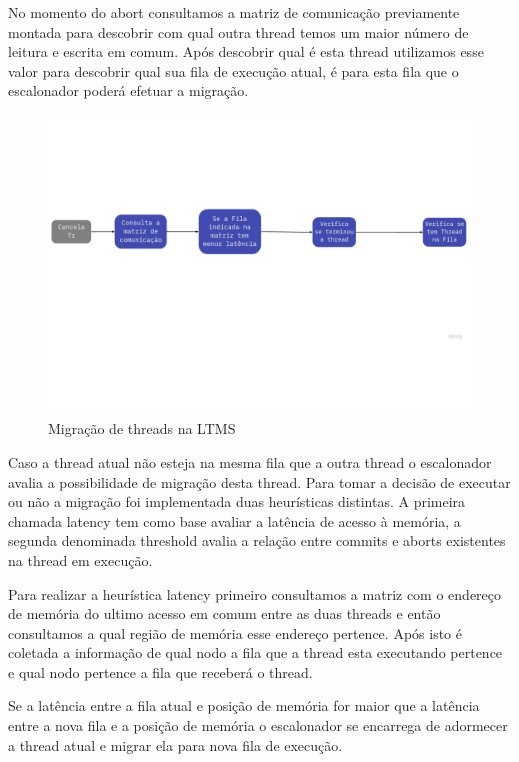 \documentclass[diss,capa]{texufpel}
\begin{document}
No momento do abort consultamos a matriz de comunicação previamente montada para descobrir com qual outra thread temos um maior número de leitura e escrita em comum. Após descobrir qual é esta thread utilizamos esse valor para descobrir qual sua fila de execução atual, é para esta fila que o escalonador poderá efetuar a migração.

\begin{figure}[htbp]
  \centering \includegraphics[scale=.5]{images/lstm2}
\caption{Migração de threads na LTMS} 
\label{LTMS2}
\end{figure}

Caso a thread atual não esteja na mesma fila que a outra thread o escalonador avalia a possibilidade de migração desta thread. Para tomar a decisão de executar ou não a migração foi implementada duas heurísticas distintas. A primeira chamada latency tem como base avaliar a latência de acesso à memória, a segunda denominada threshold avalia a relação entre commits e aborts existentes na thread em execução.

Para realizar a heurística latency primeiro consultamos a matriz com o endereço de memória do ultimo acesso em comum entre as duas threads e então consultamos a qual região de memória esse endereço pertence. Após isto é coletada a informação de qual nodo a fila que a thread esta executando pertence e qual nodo pertence a fila que receberá o thread.

Se a latência entre a fila atual e posição de memória for maior que a latência entre a nova fila e a posição de memória o escalonador se encarrega de adormecer a thread atual e migrar ela para nova fila de execução.
\end{document}
